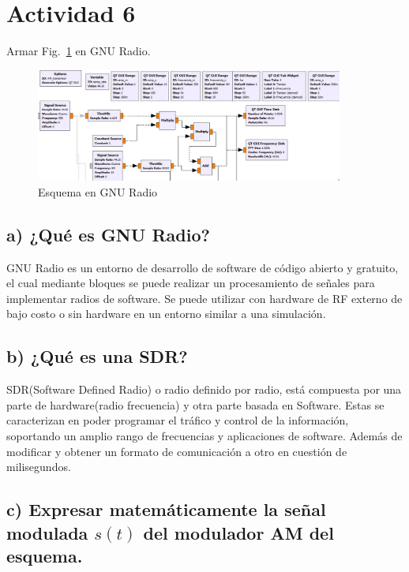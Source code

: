 \section{Actividad 6}

Armar Fig.~\ref{fig:3} en GNU Radio.  

\begin{figure}[H]
    \centering
    \includegraphics[width=0.9\textwidth]{imagenes/Parte_1/Actividad_6/fig3.png}
    \caption{Esquema en GNU Radio}
    \label{fig:3}
\end{figure}

\subsection*{a) ¿Qué es GNU Radio?}

GNU Radio es un entorno de desarrollo de software de código abierto y gratuito, el cual mediante bloques se puede realizar un procesamiento de señales para implementar radios de software. Se puede utilizar con hardware de RF externo de bajo costo o sin hardware en un entorno similar a una simulación.

\subsection*{b) ¿Qué es una SDR?}

SDR(Software Defined Radio) o radio definido por radio, está compuesta por una parte de hardware(radio frecuencia) y otra parte basada en Software. Estas se caracterizan en poder programar el tráfico y control de la información, soportando un amplio rango de frecuencias y aplicaciones de software.
Además de modificar y obtener un formato de comunicación a otro en cuestión de milisegundos.

\subsection*{c) Expresar matemáticamente la señal modulada $s(t)$ del modulador AM del esquema.}

